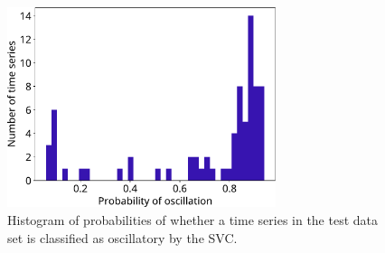 \begin{figure}
  \centering
  \includegraphics[width=0.7\textwidth]{classifier_histogram_probabilities_adapted}
  \caption{
    Histogram of probabilities of whether a time series in the test data set is classified as oscillatory by the SVC.
  }
  \label{fig:analysis-svc-proba-histogram}
\end{figure}


